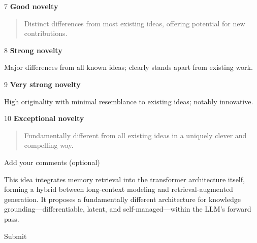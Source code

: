 \documentclass[
]{article}
\begin{document}
7 \textbf{Good novelty}

\begin{quote}
Distinct differences from most existing ideas, offering potential for
new contributions.
\end{quote}

8 \textbf{Strong novelty}

Major differences from all known ideas; clearly stands apart from
existing work.

9 \textbf{Very strong novelty}

High originality with minimal resemblance to existing ideas; notably
innovative.

10 \textbf{Exceptional novelty}

\begin{quote}
Fundamentally different from all existing ideas in a uniquely clever and
compelling way.
\end{quote}

Add your comments (optional)

This idea integrates memory retrieval into the transformer architecture
itself, forming a hybrid between long-context modeling and
retrieval-augmented generation. It proposes a fundamentally different
architecture for knowledge grounding---differentiable, latent, and
self-managed---within the LLM's forward pass.

Submit
\end{document}
